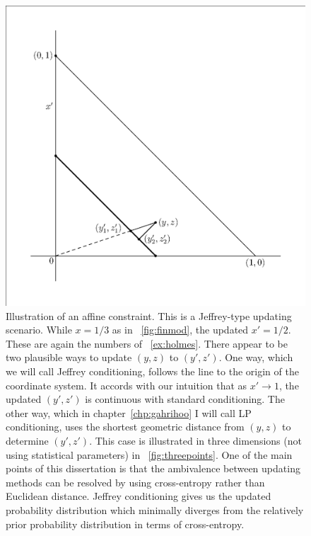 \documentclass[phd,12pt,oneside]{ubcthesis}
\begin{document}
\begin{figure}[ht!]
    \begin{minipage}[h]{.7\linewidth}
      \includegraphics[width=\textwidth]{finmoe.eps}
      \caption{\footnotesize Illustration of an affine constraint.
        This is a Jeffrey-type updating scenario. While $x=1/3$ as in
        {\igure}~\ref{fig:finmod}, the updated $x'=1/2$. These are
        again the numbers of {\xample}~\ref{ex:holmes}. There appear
        to be two plausible ways to update $(y,z)$ to $(y',z')$. One
        way, which we will call Jeffrey conditioning, follows the line
        to the origin of the coordinate system. It accords with our
        intuition that as $x'\rightarrow{}1$, the updated $(y',z')$ is
        continuous with standard conditioning. The other way, which in
        chapter~\ref{chp:gahrihoo} I will call LP conditioning, uses
        the shortest geometric distance from $(y,z)$ to determine
        $(y',z')$. This case is illustrated in three dimensions (not
        using statistical parameters) in
        {\igure}~\ref{fig:threepoints}. One of the main points of this
        dissertation is that the ambivalence between updating methods
        can be resolved by using cross-entropy rather than Euclidean
        distance. Jeffrey conditioning gives us the updated
        probability distribution which minimally diverges from the
        relatively prior probability distribution in terms of
        cross-entropy.}
      \label{fig:finmoe}
    \end{minipage}
\end{figure}
\end{document}
